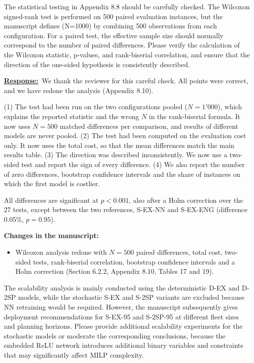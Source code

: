 \documentclass{article}
\newcommand{\response}{\vspace{0.1cm}\noindent\underline{\textbf{Response:}}\ }
\newcommand{\changes}{\vspace{0.1cm}\noindent\textbf{Changes in the manuscript:}}
\begin{document}
\begin{cmt}{}{}
The statistical testing in Appendix 8.8 should be carefully checked. The Wilcoxon signed-rank test is performed on 500 paired evaluation instances, but the manuscript defines (N=1000) by combining 500 observations from each configuration. For a paired test, the effective sample size should normally correspond to the number of paired differences. Please verify the calculation of the Wilcoxon statistic, p-values, and rank-biserial correlation, and ensure that the direction of the one-sided hypothesis is consistently described.
\end{cmt}

\response We thank the reviewer for this careful check. All points were correct, and we have redone the analysis (Appendix 8.10).

(1) The test had been run on the two configurations pooled ($N = 1'000$), which explains the reported statistic and the wrong $N$ in the rank-biserial formula. It now uses $N = 500$ matched differences per comparison, and results of different models are never pooled.
(2) The test had been computed on the evaluation cost only. It now uses the total cost, so that the mean differences match the main results table.
(3) The direction was described inconsistently. We now use a two-sided test and report the sign of every difference.
(4) We also report the number of zero differences, bootstrap confidence intervals and the share of instances on which the first model is costlier.

All differences are significant at $p < 0.001$, also after a Holm correction over the 27 tests, except between the two references, S-EX-NN and S-EX-ENG (difference 0.05\%, $p = 0.95$).

\changes
\begin{itemize}[nosep]
\item Wilcoxon analysis redone with $N = 500$ paired differences, total cost, two-sided tests, rank-biserial correlation, bootstrap confidence intervals and a Holm correction (Section 6.2.2, Appendix 8.10, Tables 17 and 19).
\end{itemize}

\begin{cmt}{}{}
The scalability analysis is mainly conducted using the deterministic D-EX and D-2SP models, while the stochastic S-EX and S-2SP variants are excluded because NN retraining would be required. However, the manuscript subsequently gives deployment recommendations for S-EX-95 and S-2SP-95 at different fleet sizes and planning horizons. Please provide additional scalability experiments for the stochastic models or moderate the corresponding conclusions, because the embedded ReLU network introduces additional binary variables and constraints that may significantly affect MILP complexity.
\end{cmt}
\end{document}
